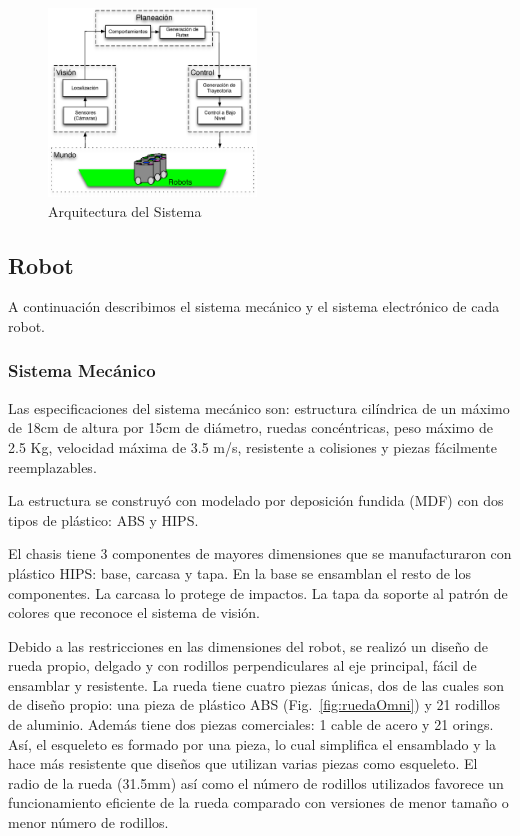 \documentclass[twocolumn,10pt]{amrob}
\begin{document}
\begin{figure}
  \centering
    \includegraphics[height=5cm]{arqGeneral.eps}
  \caption{Arquitectura del Sistema}
  \label{fig:ROSGral}
\end{figure}

\subsection*{Robot}
A continuación describimos el sistema mecánico y el sistema electrónico de cada robot. 
\subsubsection*{Sistema Mecánico}
\label{sec:sistema_movimiento}

Las especificaciones del sistema mecánico son: estructura cilíndrica de un máximo de 18cm de altura por 15cm de diámetro, ruedas concéntricas, peso máximo de 2.5 Kg, velocidad máxima de 3.5 m/s, resistente a colisiones y piezas fácilmente reemplazables.

La estructura se construyó con modelado por deposición fundida (MDF) con dos tipos de plástico: ABS y HIPS. 

El chasis tiene 3 componentes de mayores dimensiones que se manufacturaron con plástico HIPS: base, carcasa y tapa. En la base se ensamblan el resto de los componentes. La carcasa lo protege de impactos. La tapa da soporte al patrón de colores que reconoce el sistema de visión.

Debido a las restricciones en las dimensiones del robot, se realizó un diseño de rueda propio, delgado y con rodillos perpendiculares al eje principal, fácil de ensamblar y resistente. La rueda tiene cuatro piezas únicas, dos de las cuales son de diseño propio: una pieza de plástico ABS (Fig.~\ref{fig:ruedaOmni}) y 21 rodillos de aluminio. Además tiene dos piezas comerciales: 1 cable de acero y 21 orings. Así, el esqueleto es formado por una pieza, lo cual simplifica el ensamblado y la hace más resistente que diseños que utilizan varias piezas como esqueleto. El radio de la rueda (31.5mm) así como el número de rodillos utilizados favorece un funcionamiento eficiente de la rueda comparado con versiones de menor tamaño o menor número de rodillos.
\end{document}
